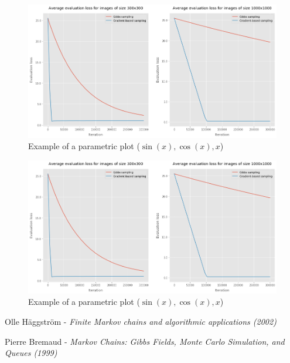 \documentclass[a4paper, 11pt, onecolumn, openany, titlepage]{report}
\theoremstyle{default_theorem_style}\newtheorem{theorem}{Theorem}
\theoremstyle{default_theorem_style}\newtheorem{definition}{Definition}
\begin{document}
\begin{figure}
\centering
\includegraphics[scale=0.4]{binary_input_size_plots}
\caption{Example of a parametric plot ($\sin (x), \cos(x), x$)}
\label{fig:xxx}
\end{figure}
\begin{figure}
\centering
\includegraphics[scale=0.4]{binary_input_size_plots}
\caption{Example of a parametric plot ($\sin (x), \cos(x), x$)}
\label{fig:yyy}
\end{figure}

\begin{thebibliography}{9}

Olle Häggström - \textit{Finite Markov chains and algorithmic applications (2002)}

Pierre Bremaud - \textit{Markov Chains: Gibbs Fields, Monte Carlo Simulation, and Queues (1999)}

\end{thebibliography}
\end{document}
